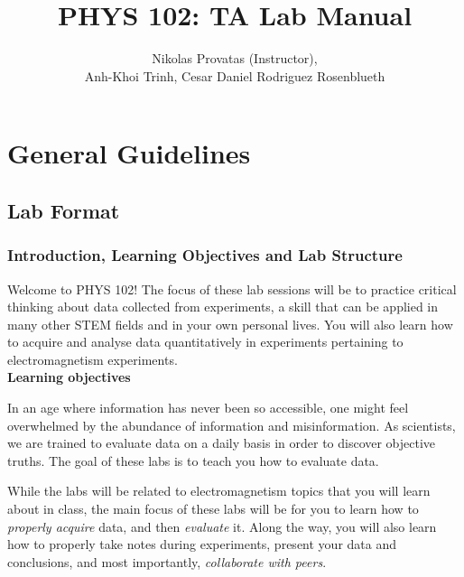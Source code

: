 \documentclass[12pt]{report}
\title{PHYS 102: TA Lab Manual}
\author{Nikolas Provatas (Instructor), \\ Anh-Khoi Trinh, Cesar Daniel Rodriguez Rosenblueth}
\begin{document}
\maketitle

\tableofcontents

\part{General Guidelines} \label{Sec:Intro}

\chapter{Lab Format}

\section{Introduction, Learning Objectives and Lab Structure}
Welcome to PHYS 102! The focus of these lab sessions will be to practice critical thinking about data collected from experiments, a skill that can be applied in many other STEM fields and in your own personal lives. You will also learn how to acquire and analyse data quantitatively in experiments pertaining to electromagnetism experiments. \\

\noindent \large \textbf{Learning objectives} \normalsize

In an age where information has never been so accessible, one might feel overwhelmed by the abundance of information and misinformation.
As scientists, we are trained to evaluate data on a daily basis in order to discover objective truths.
The goal of these labs is to teach you how to evaluate data. 

While the labs will be related to electromagnetism topics that you will learn about in class, the main focus of these labs will be for you to learn how to \textit{properly acquire} data, and then \textit{evaluate} it. Along the way, you will also learn how to properly take notes during experiments, present your data and conclusions, and most importantly, \textit{collaborate with peers}. \\

\end{document}
